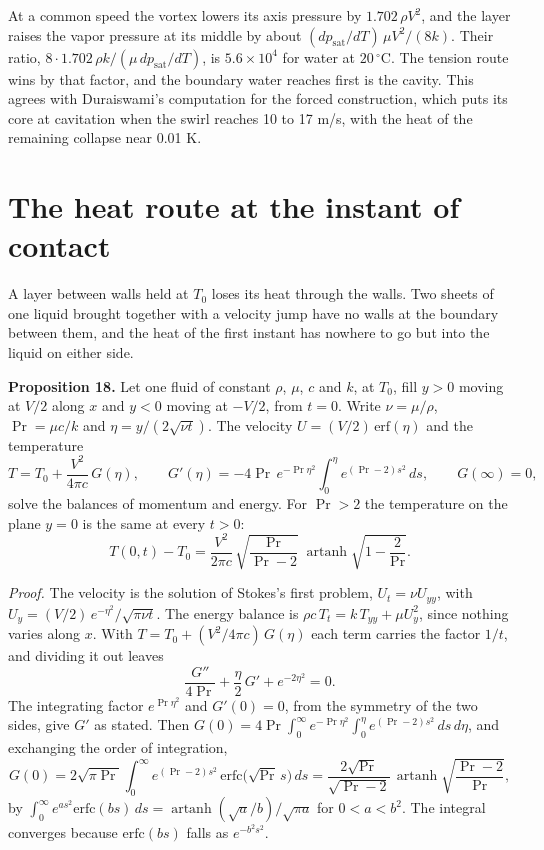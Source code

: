 At a common speed the vortex lowers its axis pressure by $1.702\,\rho V^2$, and the layer raises the
vapor pressure at its middle by about $(dp_{\mathrm{sat}}/dT)\,\mu V^2/(8k)$. Their ratio,
$8\cdot 1.702\,\rho k/(\mu\,dp_{\mathrm{sat}}/dT)$, is $5.6\times10^4$ for water at $20\,^\circ$C.
The tension route wins by that factor, and the boundary water reaches first is the cavity. This
agrees with Duraiswami's computation for the forced construction, which puts its core at
cavitation when the swirl reaches 10 to 17 m/s, with the heat of the remaining collapse near
0.01 K.

\section{The heat route at the instant of contact}

A layer between walls held at $T_0$ loses its heat through the walls. Two sheets of one liquid
brought together with a velocity jump have no walls at the boundary between them, and the heat of
the first instant has nowhere to go but into the liquid on either side.

\textbf{Proposition 18.} Let one fluid of constant $\rho$, $\mu$, $c$ and $k$, at $T_0$, fill
$y > 0$ moving at $V/2$ along $x$ and $y < 0$ moving at $-V/2$, from $t = 0$. Write
$\nu = \mu/\rho$, $\Pr = \mu c/k$ and $\eta = y/(2\sqrt{\nu t})$. The velocity
$U = (V/2)\,\mathrm{erf}(\eta)$ and the temperature
\[
T = T_0 + \frac{V^2}{4\pi c}\,G(\eta), \qquad
G'(\eta) = -4\Pr\,e^{-\Pr\eta^2}\int_0^\eta e^{(\Pr-2)s^2}\,ds, \qquad G(\infty) = 0,
\]
solve the balances of momentum and energy. For $\Pr > 2$ the temperature on the plane $y = 0$ is
the same at every $t > 0$:
\[
T(0,t) - T_0 = \frac{V^2}{2\pi c}\,\sqrt{\frac{\Pr}{\Pr - 2}}\;
\operatorname{artanh}\sqrt{1 - \frac{2}{\Pr}} .
\]

\emph{Proof.} The velocity is the solution of Stokes's first problem, $U_t = \nu U_{yy}$, with
$U_y = (V/2)\,e^{-\eta^2}/\sqrt{\pi\nu t}$. The energy balance is
$\rho c\,T_t = k\,T_{yy} + \mu U_y^2$, since nothing varies along $x$. With
$T = T_0 + (V^2/4\pi c)\,G(\eta)$ each term carries the factor $1/t$, and dividing it out leaves
\[
\frac{G''}{4\Pr} + \frac{\eta}{2}\,G' + e^{-2\eta^2} = 0 .
\]
The integrating factor $e^{\Pr\eta^2}$ and $G'(0) = 0$, from the symmetry of the two sides, give
$G'$ as stated. Then
$G(0) = 4\Pr\int_0^\infty e^{-\Pr\eta^2}\int_0^\eta e^{(\Pr-2)s^2}\,ds\,d\eta$, and exchanging the
order of integration,
\[
G(0) = 2\sqrt{\pi\Pr}\int_0^\infty e^{(\Pr-2)s^2}\,\mathrm{erfc}\big(\sqrt{\Pr}\,s\big)\,ds
= \frac{2\sqrt{\Pr}}{\sqrt{\Pr - 2}}\,\operatorname{artanh}\sqrt{\frac{\Pr - 2}{\Pr}} ,
\]
by $\int_0^\infty e^{a s^2}\mathrm{erfc}(bs)\,ds = \operatorname{artanh}(\sqrt a/b)/\sqrt{\pi a}$
for $0 < a < b^2$. The integral converges because $\mathrm{erfc}(bs)$ falls as $e^{-b^2s^2}$.
\hfill\qedsymbol

